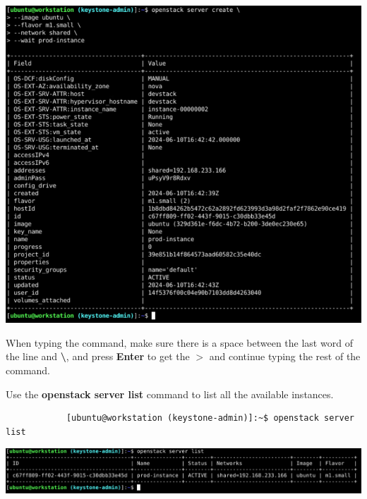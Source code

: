 \documentclass[letterpaper, 12pt]{article}
\begin{document}
\begin{enumerate}
\begin{labstep}
        \begin{center}
            \includegraphics[width=\linewidth]{images/part2/step7.png}
        \end{center}
    \end{labstep}

    \begin{tipbox}
        When typing the command, make sure there is a space between the last word of the line and \textbf{\textbackslash}, and press \textbf{Enter} to get the \textbf{$>$} and continue typing the rest of the command.
    \end{tipbox}

    \begin{labstep}
        Use the \textbf{openstack server list} command to list all the available instances.
        \begin{lstlisting}
            [ubuntu@workstation (keystone-admin)]:~$ openstack server list
        \end{lstlisting}

        \begin{center}
            \includegraphics[width=\linewidth]{images/part2/step8.png}
        \end{center}
    \end{labstep}


\end{enumerate}
\end{document}

